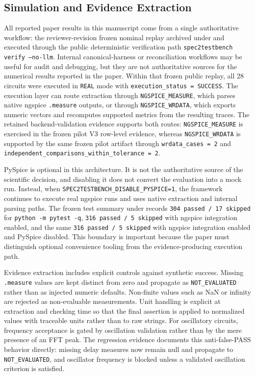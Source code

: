 \subsection{Simulation and Evidence Extraction}
All reported paper results in this manuscript come from a single authoritative workflow: the reviewer-revision frozen nominal replay archived under  and executed through the public deterministic verification path \texttt{spec2testbench verify --no-llm}. Internal canonical-harness or reconciliation workflows may be useful for audit and debugging, but they are not authoritative sources for the numerical results reported in the paper. Within that frozen public replay, all 28 circuits were executed in \texttt{REAL} mode with \texttt{execution\_status = SUCCESS}. The execution layer can route extraction through \texttt{NGSPICE\_MEASURE}, which parses native ngspice \texttt{.measure} outputs, or through \texttt{NGSPICE\_WRDATA}, which exports numeric vectors and recomputes supported metrics from the resulting traces. The retained backend-validation evidence supports both routes: \texttt{NGSPICE\_MEASURE} is exercised in the frozen pilot V3 row-level evidence, whereas \texttt{NGSPICE\_WRDATA} is supported by the same frozen pilot artifact through \texttt{wrdata\_cases = 2} and \texttt{independent\_comparisons\_within\_tolerance = 2}.

PySpice is optional in this architecture. It is not the authoritative source of the scientific decision, and disabling it does not convert the evaluation into a mock run. Instead, when \texttt{SPEC2TESTBENCH\_DISABLE\_PYSPICE=1}, the framework continues to execute real ngspice runs and uses native extraction and internal parsing paths. The frozen test summary under  records \texttt{304 passed / 17 skipped} for \texttt{python -m pytest -q}, \texttt{316 passed / 5 skipped} with ngspice integration enabled, and the same \texttt{316 passed / 5 skipped} with ngspice integration enabled and PySpice disabled. This boundary is important because the paper must distinguish optional convenience tooling from the evidence-producing execution path.

Evidence extraction includes explicit controls against synthetic success. Missing \texttt{.measure} values are kept distinct from zero and propagate as \texttt{NOT\_EVALUATED} rather than as injected numeric defaults. Non-finite values such as NaN or infinity are rejected as non-evaluable measurements. Unit handling is explicit at extraction and checking time so that the final assertion is applied to normalized values with traceable units rather than to raw strings. For oscillatory circuits, frequency acceptance is gated by oscillation validation rather than by the mere presence of an FFT peak. The regression evidence documents this anti-false-PASS behavior directly: missing delay measures now remain null and propagate to \texttt{NOT\_EVALUATED}, and oscillator frequency is blocked unless a validated oscillation criterion is satisfied.

